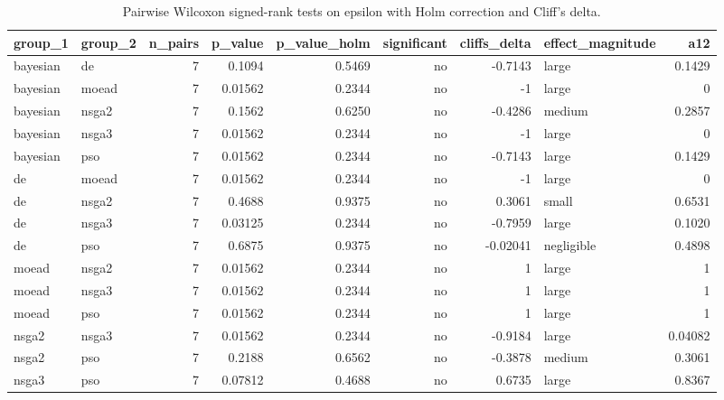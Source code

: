 \begin{table}[!t]
\centering
\caption{Pairwise Wilcoxon signed-rank tests on epsilon with Holm correction and Cliff's delta.}
\label{tab:statistics_optimizer_pairwise_epsilon_main}
\footnotesize
\begin{tabular}{llrrrrrlr}
\toprule
group\_1 & group\_2 & n\_pairs & p\_value & p\_value\_holm & significant & cliffs\_delta & effect\_magnitude & a12 \\
\midrule
bayesian & de & 7 & 0.1094 & 0.5469 & no & -0.7143 & large & 0.1429 \\
bayesian & moead & 7 & 0.01562 & 0.2344 & no & -1 & large & 0 \\
bayesian & nsga2 & 7 & 0.1562 & 0.6250 & no & -0.4286 & medium & 0.2857 \\
bayesian & nsga3 & 7 & 0.01562 & 0.2344 & no & -1 & large & 0 \\
bayesian & pso & 7 & 0.01562 & 0.2344 & no & -0.7143 & large & 0.1429 \\
de & moead & 7 & 0.01562 & 0.2344 & no & -1 & large & 0 \\
de & nsga2 & 7 & 0.4688 & 0.9375 & no & 0.3061 & small & 0.6531 \\
de & nsga3 & 7 & 0.03125 & 0.2344 & no & -0.7959 & large & 0.1020 \\
de & pso & 7 & 0.6875 & 0.9375 & no & -0.02041 & negligible & 0.4898 \\
moead & nsga2 & 7 & 0.01562 & 0.2344 & no & 1 & large & 1 \\
moead & nsga3 & 7 & 0.01562 & 0.2344 & no & 1 & large & 1 \\
moead & pso & 7 & 0.01562 & 0.2344 & no & 1 & large & 1 \\
nsga2 & nsga3 & 7 & 0.01562 & 0.2344 & no & -0.9184 & large & 0.04082 \\
nsga2 & pso & 7 & 0.2188 & 0.6562 & no & -0.3878 & medium & 0.3061 \\
nsga3 & pso & 7 & 0.07812 & 0.4688 & no & 0.6735 & large & 0.8367 \\
\bottomrule
\end{tabular}
\end{table}
